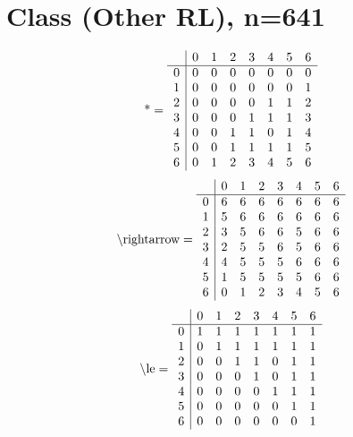 \documentclass[11pt]{article}
\begin{document}
\section{Class (Other RL), n=641}
\[\text{*} = 
\begin{array}{r | r r r r r r r}
 & 0 & 1 & 2 & 3 & 4 & 5 & 6 \\ \hline
0 & 0 & 0 & 0 & 0 & 0 & 0 & 0 \\
1 & 0 & 0 & 0 & 0 & 0 & 0 & 1 \\
2 & 0 & 0 & 0 & 0 & 1 & 1 & 2 \\
3 & 0 & 0 & 0 & 1 & 1 & 1 & 3 \\
4 & 0 & 0 & 1 & 1 & 0 & 1 & 4 \\
5 & 0 & 0 & 1 & 1 & 1 & 1 & 5 \\
6 & 0 & 1 & 2 & 3 & 4 & 5 & 6 \\
\end{array}
\]
\[\text{\textbackslash rightarrow} = 
\begin{array}{r | r r r r r r r}
 & 0 & 1 & 2 & 3 & 4 & 5 & 6 \\ \hline
0 & 6 & 6 & 6 & 6 & 6 & 6 & 6 \\
1 & 5 & 6 & 6 & 6 & 6 & 6 & 6 \\
2 & 3 & 5 & 6 & 6 & 5 & 6 & 6 \\
3 & 2 & 5 & 5 & 6 & 5 & 6 & 6 \\
4 & 4 & 5 & 5 & 5 & 6 & 6 & 6 \\
5 & 1 & 5 & 5 & 5 & 5 & 6 & 6 \\
6 & 0 & 1 & 2 & 3 & 4 & 5 & 6 \\
\end{array}
\]
\[\text{\textbackslash le} = 
\begin{array}{r | r r r r r r r}
 & 0 & 1 & 2 & 3 & 4 & 5 & 6 \\ \hline
0 & 1 & 1 & 1 & 1 & 1 & 1 & 1 \\
1 & 0 & 1 & 1 & 1 & 1 & 1 & 1 \\
2 & 0 & 0 & 1 & 1 & 0 & 1 & 1 \\
3 & 0 & 0 & 0 & 1 & 0 & 1 & 1 \\
4 & 0 & 0 & 0 & 0 & 1 & 1 & 1 \\
5 & 0 & 0 & 0 & 0 & 0 & 1 & 1 \\
6 & 0 & 0 & 0 & 0 & 0 & 0 & 1 \\
\end{array}
\]
\end{document}

